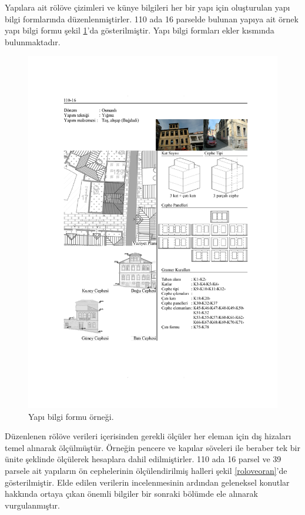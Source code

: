 \documentclass[12pt,turkish,a4paperpaper,]{report}
\begin{document}
Yapılara ait rölöve çizimleri ve künye bilgileri her bir yapı için
oluşturulan yapı bilgi formlarında düzenlenmiştirler. 110 ada 16
parselde bulunan yapıya ait örnek yapı bilgi formu şekil
\ref{yapibilgiformu}'da gösterilmiştir. Yapı bilgi formları ekler
kısmında bulunmaktadır.

\begin{figure}
\centering
\includegraphics[width=1\textwidth,height=\textheight]{source/figures/BilgiFormlari/110-16.pdf}
\caption{Yapı bilgi formu örneği. \label{yapibilgiformu}}
\end{figure}

Düzenlenen rölöve verileri içerisinden gerekli ölçüler her eleman için
dış hizaları temel alınarak ölçülmüştür. Örneğin pencere ve kapılar
söveleri ile beraber tek bir ünite şeklinde ölçülerek hesaplara dahil
edilmiştirler. 110 ada 16 parsel ve 39 parsele ait yapıların ön
cephelerinin ölçülendirilmiş halleri şekil \ref{roloveoran}'de
gösterilmiştir. Elde edilen verilerin incelenmesinin ardından geleneksel
konutlar hakkında ortaya çıkan önemli bilgiler bir sonraki bölümde ele
alınarak vurgulanmıştır.
\end{document}
